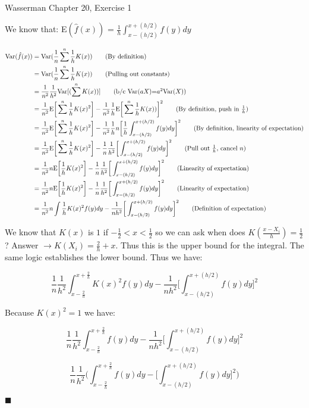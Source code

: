 \documentclass[12pt]{amsart}
\title{}
\author{}
\date{} %
\newcommand{\fhat}{\frac{1}{h}\int_{x-(h/2)}^{x+(h/2)}f(y)dy}
\begin{document}
\maketitle

Wasserman Chapter 20, Exercise 1

We know that: E$(\hat{f}(x))$ = $\fhat$

\begin{align}
\text{Var}(\hat{f}(x)) &= \text{Var} (\frac{1}{n}\sum^n\frac{1}{h}K(x)) \tag{By definition} \\ 
                                &= \text{Var} (\frac{1}{n}\sum^n\frac{1}{h} K(x)) \tag{Pulling out constants} \\
                                &= \frac{1}{n^2}\frac{1}{h^2} \text{Var} [(\sum^nK(x))] \tag{b/c Var$(aX)$=$a^2$Var$(X)$} \\
			       &= \frac{1}{n^2} \text{E} \bigg[ \sum^n\frac{1}{h}K(x)^2 \bigg] -  \frac{1}{n^2}\frac{1}{h} \text{E} \bigg[\sum^n\frac{1}{h}K(x))\bigg] ^2  \tag{By definition, push in $\frac{1}{h}$} \\
			       &= \frac{1}{n^2} \text{E} \bigg[ \sum^n\frac{1}{h}K(x)^2 \bigg] -  \frac{1}{n^2} \frac{1}{h} n \bigg[ \fhat \bigg]^2 \tag{By definition, linearity of expectation} \\
			       &= \frac{1}{n^2} \text{E} \bigg[ \sum^n\frac{1}{h}K(x)^2 \bigg] -  \frac{1}{n} \frac{1}{h^2} \bigg[ \int_{x-(h/2)}^{x+(h/2)}f(y)dy \bigg]^2 \tag{Pull out $\frac{1}{h}$, cancel $n$} \\
			     &= \frac{1}{n^2} n \text{E} \bigg[\frac{1}{h}K(x)^2 \bigg] -  \frac{1}{n} \frac{1}{h^2} \bigg[ \int_{x-(h/2)}^{x+(h/2)}f(y)dy \bigg]^2 \tag{Linearity of expectation} \\
			     &= \frac{1}{n^2} n \text{E} \bigg[\frac{1}{h}K(x)^2 \bigg] -  \frac{1}{n} \frac{1}{h^2} \bigg[ \int_{x-(h/2)}^{x+(h/2)}f(y)dy \bigg]^2 \tag{Linearity of expectation} \\
			    &= \frac{1}{n^2} n  \int \frac{1}{h}K(x)^2 f(y)dy -  \frac{1}{nh^2} \bigg[ \int_{x-(h/2)}^{x+(h/2)}f(y)dy \bigg]^2 \tag{Definition of expectation} 
\end{align}

We know that $K(x)$ is $1$ if $-\frac{1}{2} < x < \frac{1}{2}$ so we can ask when does $K(\frac{x-X_i}{h}) = \frac{1}{2}$? Answer  $\rightarrow K(X_i) = \frac{2}{h} + x$. Thus this is the upper bound for the integral. The same logic establishes the lower bound. Thus we have:

$$
\frac{1}{n}\frac{1}{h^2} \int^{x+\frac{2}{h} }_{x-\frac{2}{h}} K(x)^2 f(y)dy -  \frac{1}{nh^2} \bigg[ \int_{x-(h/2)}^{x+(h/2)}f(y)dy \bigg]^2
$$

Because $K(x)^2 = 1$ we have:

$$
\frac{1}{n}\frac{1}{h^2} \int^{x+\frac{2}{h} }_{x-\frac{2}{h}} f(y)dy -  \frac{1}{nh^2} \bigg[ \int_{x-(h/2)}^{x+(h/2)}f(y)dy \bigg]^2
$$

$$
\frac{1}{n}\frac{1}{h^2} \bigg( \int^{x+\frac{2}{h} }_{x-\frac{2}{h}} f(y)dy -  \bigg[ \int_{x-(h/2)}^{x+(h/2)}f(y)dy \bigg]^2 \bigg)
$$

$\blacksquare$
\end{document}
